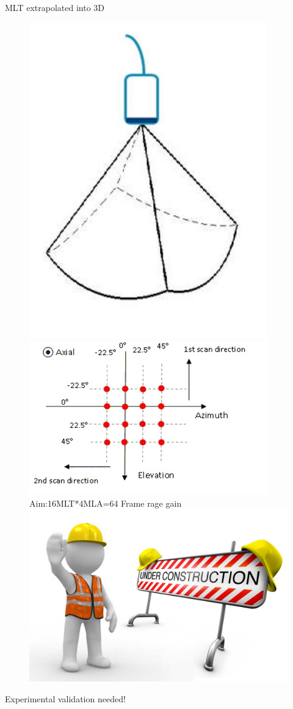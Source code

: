 \documentclass[t,12pt,english
\ifx\beamermode\undefined\else,\beamermode\fi
]{beamer}
\begin{document}
\begin{frame}{MLT extrapolated into 3D}


\begin{figure}[!htb]
\includegraphics[width=.3\textwidth]{29.jpg}\\
\includegraphics[width=.5\textwidth]{26.jpg}\\
\tiny Aim:\color{red}16MLT*\color{green}4MLA=\color{blue}64 Frame rage gain\\


\endminipage
{}
\centering
\includegraphics[width=1\textwidth]{23.jpg}\\
\endminipage
\end{figure}

\small Experimental validation needed\cite{7}!

\end{frame}
\end{document}
